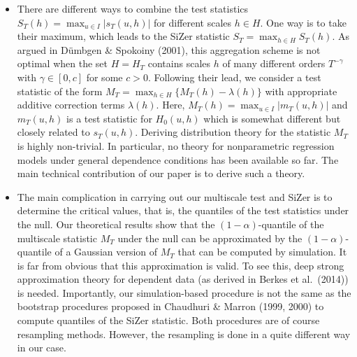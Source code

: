 \documentclass[a4paper,12pt]{article}
\begin{document}
\begin{itemize}[leftmargin=0.5cm]
\item There are different ways to combine the test statistics $S_T(h) = \max_{u \in I} |s_T(u,h)|$ for different scales $h \in H$. One way is to take their maximum, which leads to the SiZer statistic $S_T = \max_{h \in H} S_T(h)$. As argued in D\"umbgen \& Spokoiny (2001), this aggregation scheme is not optimal when the set $H = H_T$ contains scales $h$ of many different orders $T^{-\gamma}$ with $\gamma \in [0,c]$ for some $c > 0$. Following their lead, we consider a test statistic of the form $M_T = \max_{h \in H} \{ M_T(h) - \lambda(h) \}$ with appropriate additive correction terms $\lambda(h)$. Here, $M_T(h) = \max_{u \in I} |m_T(u,h)|$ and $m_T(u,h)$ is a test statistic for $H_0(u,h)$ which is somewhat different but closely related to $s_T(u,h)$. Deriving distribution theory for the statistic $M_T$ is highly non-trivial. In particular, no theory for nonparametric regression models under general dependence conditions has been available so far. The main technical contribution of our paper is to derive such a theory. %

\item The main complication in carrying out our multiscale test and SiZer is to determine the critical values, that is, the quantiles of the test statistics under the null. Our theoretical results show that the $(1-\alpha)$-quantile of the multiscale statistic $M_T$ under the null can be approximated by the $(1-\alpha)$-quantile of a Gaussian version of $M_T$ that can be computed by simulation. It is far from obvious that this approximation is valid. To see this, deep strong approximation theory for dependent data (as derived in Berkes et al.\ (2014)) is needed. Importantly, our simulation-based procedure is not the same as the bootstrap procedures proposed in Chaudhuri \& Marron (1999, 2000) to compute quantiles of the SiZer statistic. Both procedures are of course resampling methods. However, the resampling is done in a quite different way in our case. 


\end{itemize}
\end{document}
